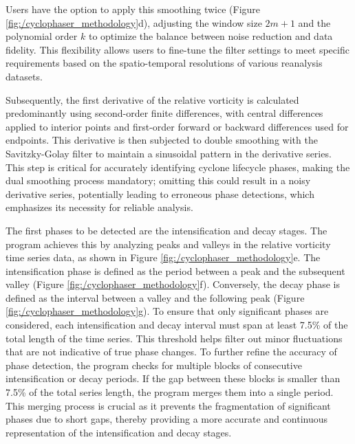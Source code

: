 Users have the option to apply this smoothing twice (Figure \ref{fig:/cyclophaser_methodology}d), adjusting the window size \( 2m+1 \) and the polynomial order \( k \) to optimize the balance between noise reduction and data fidelity. This flexibility allows users to fine-tune the filter settings to meet specific requirements based on the spatio-temporal resolutions of various reanalysis datasets.

Subsequently, the first derivative of the relative vorticity is calculated predominantly using second-order finite differences, with central differences applied to interior points and first-order forward or backward differences used for endpoints. This derivative is then subjected to double smoothing with the Savitzky-Golay filter to maintain a sinusoidal pattern in the derivative series. This step is critical for accurately identifying cyclone lifecycle phases, making the dual smoothing process mandatory; omitting this could result in a noisy derivative series, potentially leading to erroneous phase detections, which emphasizes its necessity for reliable analysis.

The first phases to be detected are the intensification and decay stages. The program achieves this by analyzing peaks and valleys in the relative vorticity time series data, as shown in Figure \ref{fig:/cyclophaser_methodology}e. The intensification phase is defined as the period between a peak and the subsequent valley (Figure \ref{fig:/cyclophaser_methodology}f). Conversely, the decay phase is defined as the interval between a valley and the following peak (Figure \ref{fig:/cyclophaser_methodology}g). To ensure that only significant phases are considered, each intensification and decay interval must span at least 7.5\% of the total length of the time series. This threshold helps filter out minor fluctuations that are not indicative of true phase changes. To further refine the accuracy of phase detection, the program checks for multiple blocks of consecutive intensification or decay periods. If the gap between these blocks is smaller than 7.5\% of the total series length, the program merges them into a single period. This merging process is crucial as it prevents the fragmentation of significant phases due to short gaps, thereby providing a more accurate and continuous representation of the intensification and decay stages.


